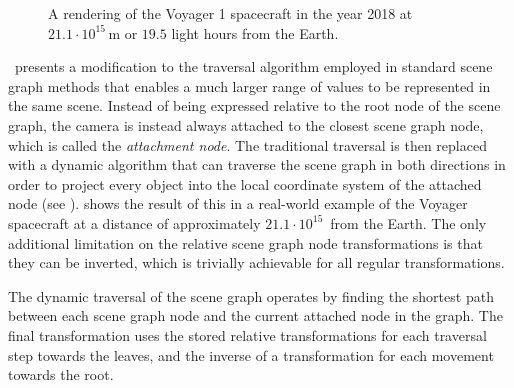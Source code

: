 \begin{figure}
\centering
{}
\caption{A rendering of the Voyager 1 spacecraft in the year 2018 at $21.1 \cdot 10^{15}\,$m or $19.5$ light hours from the Earth.}
\label{contributions:astro:dsg:voyager}
\end{figure}


\paperDSG\ presents a modification to the traversal algorithm employed in standard scene graph methods that enables a much larger range of values to be represented in the same scene.  Instead of being expressed relative to the root node of the scene graph, the camera is instead always attached to the closest scene graph node, which is called the \emph{attachment node}.  The traditional traversal is then replaced with a dynamic algorithm that can traverse the scene graph in both directions in order to project every object into the local coordinate system of the attached node (see ).   shows the result of this in a real-world example of the Voyager spacecraft at a distance of approximately $21.1 \cdot 10^{15}\,$ from the Earth.  The only additional limitation on the relative scene graph node transformations is that they can be inverted, which is trivially achievable for all regular transformations.

The dynamic traversal of the scene graph operates by finding the shortest path between each scene graph node and the current attached node in the graph.  The final transformation uses the stored relative transformations for each traversal step towards the leaves, and the inverse of a transformation for each movement towards the root.

